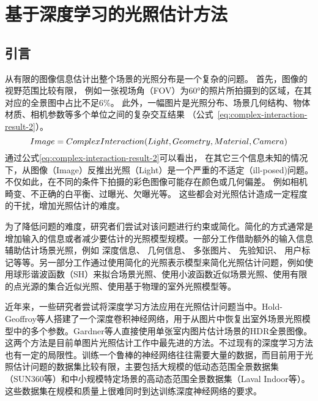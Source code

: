 \chapter{基于深度学习的光照估计方法}\label{chap:illumination-estimation}
\section{引言}
从有限的图像信息估计出整个场景的光照分布是一个复杂的问题。
首先，图像的视野范围比较有限，
例如一张视场角（FOV）为60°的照片所拍摄到的区域，在其对应的全景图中占比不足6\%。
此外，一幅图片是光照分布、场景几何结构、物体材质、相机参数等多个单位之间的复杂交互结果
（公式~\ref{eq:complex-interaction-result-2}）。
\begin{equation} \centering \label{eq:complex-interaction-result-2}
Image = ComplexInteraction(Light, Geometry, Material, Camera)\end{equation}
通过公式\ref{eq:complex-interaction-result-2}可以看出，
在其它三个信息未知的情况下，从图像（Image）反推出光照（Light）是一个严重的不适定（ill-posed)问题。
不仅如此，在不同的条件下拍摄的彩色图像可能存在颜色或几何偏差。
例如相机畸变、不正确的白平衡、过曝光、欠曝光等。
这些都会对光照估计造成一定程度的干扰，增加光照估计的难度。

为了降低问题的难度，研究者们尝试对该问题进行约束或简化。简化的方式通常是增加输入的信息或者减少要估计的光照模型规模。一部分工作借助额外的输入信息辅助估计场景光照，例如
深度信息\cite{knecht2012reciprocal,meilland20133d,zhang2016emptying,barron2013intrinsic}、
几何信息\cite{ramamoorthi2001signal,sato2003illumination,li2003multiple}、
多张图片\cite{sato1999acquiring,nishino2001determining,yu2006sparse}、
先验知识\cite{nishino2004eyes,barron2015shape,lopez2010compositing}、
用户标记\cite{lopez2010compositing,karsch2011rendering}等等。另一部分工作通过使用简化的光照表示模型来简化光照估计问题，例如使用球形谐波函数（SH）来拟合场景光照\cite{ramamoorthi2001signal,kemelmacher20113d,garrido2013reconstructing, knorr2014real,
li2014intrinsic,barron2015shape, rematas2016deep}、使用小波函数近似场景光照\cite{okabe2004spherical}、使用有限的点光源的集合近似光照\cite{sato1999acquiring,  panagopoulos2011illumination, wang2002estimation, li2003multiple, sato2003illumination}、使用基于物理的室外光照模型\cite{lalonde2008does, lalonde2010sun, lalonde2012estimating, sunkavalli2008color}等。

近年来，一些研究者尝试将深度学习方法应用在光照估计问题当中。Hold-Geoffroy等人\cite{hold2017deep}搭建了一个深度卷积神经网络，用于从图片中恢复出室外场景光照模型中的多个参数。Gardner等人\cite{gardner2017learning}直接使用单张室内图片估计场景的HDR全景图像。这两个方法是目前单图片光照估计工作中最先进的方法。不过现有的深度学习方法也有一定的局限性。训练一个鲁棒的神经网络往往需要大量的数据，而目前用于光照估计问题的数据集比较有限，主要包括大规模的低动态范围全景数据集（SUN360\cite{xiao2012recognizing}等）和中小规模特定场景的高动态范围全景数据集（Laval Indoor等\cite{gardner2017learning}）。这些数据集在规模和质量上很难同时到达训练深度神经网络的要求。

